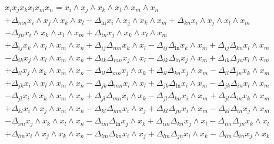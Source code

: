 \documentclass[aps, preprint]{revtex4}
\begin{document}
\begin{align} & x_{i} x_{j} x_{k} x_{l} x_{m} x_{n} =x_{i} \wedge x_{j} \wedge x_{k} \wedge x_{l} \wedge x_{m} \wedge x_{n} \nonumber  \\
 &  + \Delta _{m n}x_{i} \wedge x_{j} \wedge x_{k} \wedge x_{l} - \Delta _{\ln }x_{i} \wedge x_{j} \wedge x_{k} \wedge x_{m} + \Delta _{k n}x_{i} \wedge x_{j} \wedge x_{l} \wedge x_{m} \nonumber  \\
 &  - \Delta _{j n}x_{i} \wedge x_{k} \wedge x_{l} \wedge x_{m} + \Delta _{i n}x_{j} \wedge x_{k} \wedge x_{l} \wedge x_{m} \nonumber  \\
 &  + \Delta _{i j}x_{k} \wedge x_{l} \wedge x_{m} \wedge x_{n} + \Delta _{i j} \Delta _{m n}x_{k} \wedge x_{l} - \Delta _{i j} \Delta _{\ln }x_{k} \wedge x_{m} + \Delta _{i j} \Delta _{k n}x_{l} \wedge x_{m} \nonumber  \\
 &  - \Delta _{i k}x_{j} \wedge x_{l} \wedge x_{m} \wedge x_{n} + \Delta _{i k} \Delta _{m n}x_{j} \wedge x_{l} - \Delta _{i k} \Delta _{\ln }x_{j} \wedge x_{m} + \Delta _{i k} \Delta _{j n}x_{l} \wedge x_{m} \nonumber  \\
 &  + \Delta _{i l}x_{j} \wedge x_{k} \wedge x_{m} \wedge x_{n} - \Delta _{i l} \Delta _{m n}x_{j} \wedge x_{k} + \Delta _{i l} \Delta _{k n}x_{j} \wedge x_{m} - \Delta _{i l} \Delta _{j n}x_{k} \wedge x_{m} \nonumber  \\
 &  + \Delta _{j k}x_{i} \wedge x_{l} \wedge x_{m} \wedge x_{n} - \Delta _{j k} \Delta _{m n}x_{i} \wedge x_{l} + \Delta _{j k} \Delta _{\ln }x_{i} \wedge x_{m} - \Delta _{j k} \Delta _{i n}x_{l} \wedge x_{m} \nonumber  \\
 &  - \Delta _{j l}x_{i} \wedge x_{k} \wedge x_{m} \wedge x_{n} + \Delta _{j l} \Delta _{m n}x_{i} \wedge x_{k} - \Delta _{j l} \Delta _{k n}x_{i} \wedge x_{m} + \Delta _{j l} \Delta _{i n}x_{k} \wedge x_{m} \nonumber  \\
 &  + \Delta _{k l}x_{i} \wedge x_{j} \wedge x_{m} \wedge x_{n} - \Delta _{k l} \Delta _{m n}x_{i} \wedge x_{j} + \Delta _{k l} \Delta _{j n}x_{i} \wedge x_{m} - \Delta _{k l} \Delta _{i n}x_{j} \wedge x_{m} \nonumber  \\
 &  - \Delta _{i m}x_{j} \wedge x_{k} \wedge x_{l} \wedge x_{n} - \Delta _{i m} \Delta _{\ln }x_{j} \wedge x_{k} + \Delta _{i m} \Delta _{k n}x_{j} \wedge x_{l} - \Delta _{i m} \Delta _{j n}x_{k} \wedge x_{l} \nonumber  \\
 &  + \Delta _{l m}x_{i} \wedge x_{j} \wedge x_{k} \wedge x_{n} - \Delta _{l m} \Delta _{k n}x_{i} \wedge x_{j} + \Delta _{l m} \Delta _{j n}x_{i} \wedge x_{k} - \Delta _{l m} \Delta _{i n}x_{j} \wedge x_{k} \nonumber  \\

\end{align}
\end{document}
